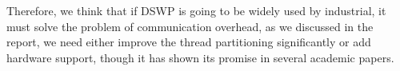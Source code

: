 \documentclass[11pt, letter]{article}
\begin{document}
Therefore, we think that if DSWP is going to be widely used by industrial, it must solve the problem of communication overhead, as we discussed in the report, we need either improve the thread partitioning significantly or add hardware support,  though it has shown its promise in several academic papers. 



\end{document}
